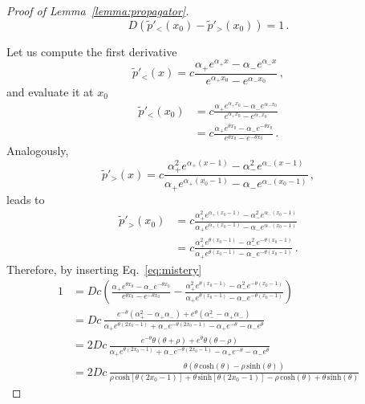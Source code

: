\documentclass[preprint,12pt]{elsarticle}
\numberwithin{equation}{section}
\theoremstyle{plain} \newtheorem{theorem}{Theorem}[section]
\theoremstyle{plain} \newtheorem{proposition}[theorem]{Proposition}
\theoremstyle{plain} \newtheorem{lemma}[theorem]{Lemma}
\theoremstyle{plain} \newtheorem{corollary}[theorem]{Corollary}
\theoremstyle{definition} \newtheorem{definition}[theorem]{Definition}
\theoremstyle{definition} \newtheorem{notation}[theorem]{Notation}
\theoremstyle{remark} \newtheorem{remark}[theorem]{Remark}
\theoremstyle{remark} \newtheorem{remarks}[theorem]{Remarks}
\theoremstyle{remark} \newtheorem{algorithm2}[theorem]{Algorithm}
\theoremstyle{remark} \newtheorem{example}[theorem]{Example}
\begin{document}
\begin{appendices}
\begin{proof}[Proof of Lemma~\ref{lemma:propagator}]
\begin{equation}
\label{eq:mistery}
	D\left( \tilde{p}'_<(x_0)-\tilde{p}'_>(x_0)	\right)=1\,.
\end{equation}

Let us compute the first derivative
\begin{equation*}
	\tilde{p}'_<(x)=c \frac{\alpha_+ e^{\alpha_+ x} -\alpha_- e^{\alpha_- x}}{e^{\alpha_+ x_0}-e^{\alpha_- x_0}}\,,
\end{equation*}
and evaluate it at $x_0$
\begin{align*}
	\tilde{p}'_ < (x_0)&=c\frac{\alpha_+ e^{\alpha_+ x_0}	-\alpha_- e^{\alpha_- x_0}}{e^{\alpha_+ x_0}-e^{\alpha_- x_0}}
	\\
	&=c \frac{\alpha_+ e^{\theta x_0} -\alpha_- e^{-\theta x_0}}{e^{\theta x_0}-e^{-\theta x_0}}	\,.
\end{align*}
Analogously,
\begin{equation*}
\tilde{p}'_>(x)=c\frac{\alpha_+^2 e^{\alpha_+ (x-1)} - \alpha_-^2 e^{\alpha_- (x-1)}}{\alpha_+ e^{\alpha_+ (x_0-1)} - \alpha_- e^{\alpha_- (x_0-1)}}\,,
\end{equation*}
leads to
\begin{align*}
	\tilde{p}'_ >(x_0)&=c\frac{\alpha_+^2 e^{\alpha_+ (x_0-1)} - \alpha_-^2 e^{\alpha_- (x_0-1)}}{\alpha_+ e^{\alpha_+ (x_0-1)} - \alpha_- e^{\alpha_- (x_0-1)}}
	\\
	&=c\frac{\alpha_+^2e^{\theta (x_0-1)}-\alpha_-^2e^{-\theta (x_0-1)}}{\alpha_+ e^{\theta (x_0-1)}-\alpha_- e^{-\theta (x_0-1)}}\,.
\end{align*}
Therefore, by inserting Eq.~\eqref{eq:mistery}
\begin{align*}
	1&=Dc\left(
    \frac{\alpha_+ e^{\theta x_0}-\alpha_- e^{-\theta x_0}}{e^{\theta x_0}-e^{-\theta x_0}}
	-
	\frac{\alpha_+^2e^{\theta (x_0-1)}-\alpha_-^2e^{-\theta (x_0-1)}}{\alpha_+ e^{\theta (x_0-1)}-\alpha_- e^{-\theta (x_0-1)}}
    \right)
	\\
	&=Dc \, \frac{e^{-\theta}(\alpha_+^2-\alpha_+\alpha_-)+e^\theta(\alpha_-^2-\alpha_+\alpha_-)}{\alpha_+ e^{\theta(2x_0-1)}+ \alpha_- e^{-\theta(2x_0-1)}-\alpha_+ e^{-\theta} -\alpha_- e^\theta}
	\\
	&=2Dc \, \frac{e^{-\theta}\theta(\theta+\rho)+e^\theta\theta(\theta-\rho)}{\alpha_+ e^{\theta(2x_0-1)}+ \alpha_- e^{-\theta(2x_0-1)}-\alpha_+ e^{-\theta} -\alpha_- e^\theta}
	\\
	&=2Dc \, \frac{\theta (\theta \, \mathrm{cosh}(\theta)-\rho \, \mathrm{sinh}(\theta))}{\rho \, \mathrm{cosh}[\theta (2x_0-1)]+\theta \, \mathrm{sinh}[\theta (2x_0-1)] -\rho \, \mathrm{cosh}(\theta)+\theta \, \mathrm{sinh}(\theta)}

\end{align*}
\end{proof}
\end{appendices}
\end{document}
